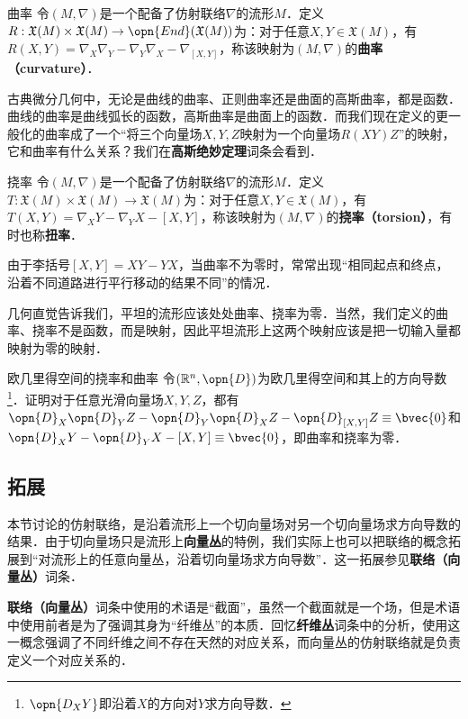 \begin{definition}{曲率}
令$(M, \nabla)$是一个配备了仿射联络$\nabla$的流形$M$．定义$R:\mathfrak{X}(M)\times\mathfrak{X}(M)\to\opn{End}(\mathfrak{X}(M))$为：对于任意$X, Y\in\mathfrak{X}(M)$，有$R(X, Y)=\nabla_X\nabla_Y-\nabla_Y\nabla_X-\nabla_{[X, Y]}$，称该映射为$(M, \nabla)$的\textbf{曲率（curvature）}．
\end{definition}

古典微分几何中，无论是曲线的曲率、正则曲率还是曲面的高斯曲率，都是函数．曲线的曲率是曲线弧长的函数，高斯曲率是曲面上的函数．而我们现在定义的更一般化的曲率成了一个“将三个向量场$X, Y, Z$映射为一个向量场$R(XY)Z$”的映射，它和曲率有什么关系？我们在\textbf{高斯绝妙定理}词条会看到．

\begin{definition}{挠率}
令$(M, \nabla)$是一个配备了仿射联络$\nabla$的流形$M$．定义$T:\mathfrak{X}(M)\times\mathfrak{X}(M)\to\mathfrak{X}(M)$为：对于任意$X, Y\in\mathfrak{X}(M)$，有$T(X, Y)=\nabla_XY-\nabla_YX-{[X, Y]}$，称该映射为$(M, \nabla)$的\textbf{挠率（torsion）}，有时也称\textbf{扭率}．
\end{definition}

由于李括号$[X, Y]=XY-YX$，当曲率不为零时，常常出现“相同起点和终点，沿着不同道路进行平行移动的结果不同”的情况．

几何直觉告诉我们，平坦的流形应该处处曲率、挠率为零．当然，我们定义的曲率、挠率不是函数，而是映射，因此平坦流形上这两个映射应该是把一切输入量都映射为零的映射．

\begin{exercise}{欧几里得空间的挠率和曲率}
令$(\mathbb{R}^n, \opn{D})$为欧几里得空间和其上的方向导数\footnote{$\opn{D_XY}$即沿着$X$的方向对$Y$求方向导数．}．证明对于任意光滑向量场$X, Y, Z$，都有$\opn{D}_X\opn{D}_YZ-\opn{D}_Y\opn{D}_XZ-\opn{D}_{[X, Y]}Z\equiv\bvec{0}$和$\opn{D}_XY-\opn{D}_YX-{[X, Y]}\equiv\bvec{0}$，即曲率和挠率为零．
\end{exercise}


\subsection{拓展}

本节讨论的仿射联络，是沿着流形上一个切向量场对另一个切向量场求方向导数的结果．由于切向量场只是流形上\textbf{向量丛}的特例，我们实际上也可以把联络的概念拓展到“对流形上的任意向量丛，沿着切向量场求方向导数”．这一拓展参见\textbf{联络（向量丛）}词条．

\textbf{联络（向量丛）}词条中使用的术语是“截面”，虽然一个截面就是一个场，但是术语中使用前者是为了强调其身为“纤维丛”的本质．回忆\textbf{纤维丛}词条中的分析，使用这一概念强调了不同纤维之间不存在天然的对应关系，而向量丛的仿射联络就是负责定义一个对应关系的．




